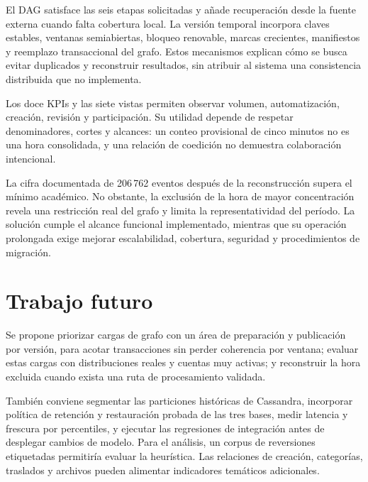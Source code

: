 El DAG satisface las seis etapas solicitadas y añade recuperación desde la fuente externa cuando falta cobertura local. La versión temporal incorpora claves estables, ventanas semiabiertas, bloqueo renovable, marcas crecientes, manifiestos y reemplazo transaccional del grafo. Estos mecanismos explican cómo se busca evitar duplicados y reconstruir resultados, sin atribuir al sistema una consistencia distribuida que no implementa.

Los doce KPIs y las siete vistas permiten observar volumen, automatización, creación, revisión y participación. Su utilidad depende de respetar denominadores, cortes y alcances: un conteo provisional de cinco minutos no es una hora consolidada, y una relación de coedición no demuestra colaboración intencional.

La cifra documentada de 206\,762 eventos después de la reconstrucción supera el mínimo académico. No obstante, la exclusión de la hora de mayor concentración revela una restricción real del grafo y limita la representatividad del período. La solución cumple el alcance funcional implementado, mientras que su operación prolongada exige mejorar escalabilidad, cobertura, seguridad y procedimientos de migración.

\section{Trabajo futuro}
Se propone priorizar cargas de grafo con un área de preparación y publicación por versión, para acotar transacciones sin perder coherencia por ventana; evaluar estas cargas con distribuciones reales y cuentas muy activas; y reconstruir la hora excluida cuando exista una ruta de procesamiento validada.

También conviene segmentar las particiones históricas de Cassandra, incorporar política de retención y restauración probada de las tres bases, medir latencia y frescura por percentiles, y ejecutar las regresiones de integración antes de desplegar cambios de modelo. Para el análisis, un corpus de reversiones etiquetadas permitiría evaluar la heurística. Las relaciones de creación, categorías, traslados y archivos pueden alimentar indicadores temáticos adicionales.

